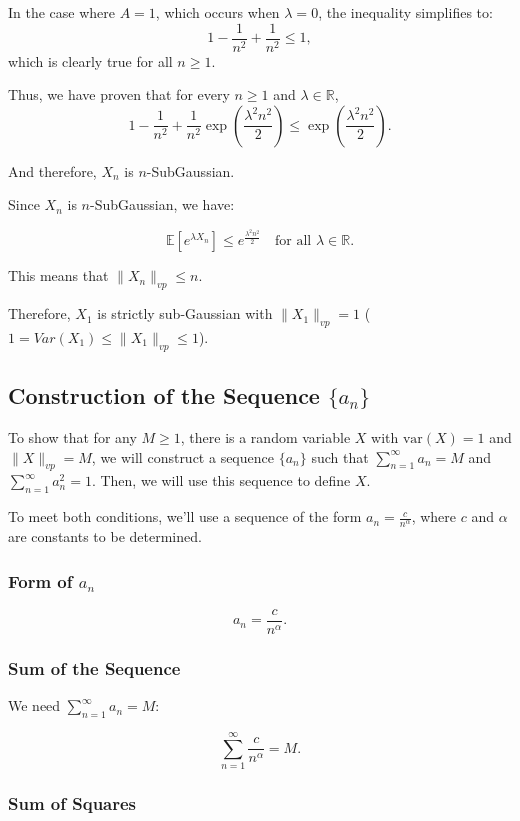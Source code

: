 \documentclass[a4 paper]{article}
\theoremstyle{boldStyle}
\theoremstyle{boldBlueStyle}
\theoremstyle{boldPurpleStyle}
\theoremstyle{boldRedStyle}
\begin{document}
\begin{enumerate}
In the case where $A = 1$, which occurs when $\lambda = 0$, the inequality simplifies to:
\[
1 - \frac{1}{n^2} + \frac{1}{n^2} \leq 1,
\]
which is clearly true for all $n \geq 1$.

Thus, we have proven that for every $n \geq 1$ and $\lambda \in \mathbb{R}$,
\[
1 - \frac{1}{n^2} + \frac{1}{n^2} \exp\left( \frac{\lambda^2 n^2}{2} \right) \leq \exp\left( \frac{\lambda^2 n^2}{2} \right).
\]

And therefore, $X_n$ is $n$-SubGaussian.

Since $X_n$ is $n$-SubGaussian, we have:

\[
\mathbb{E}[e^{\lambda X_n}] \leq e^{\frac{\lambda^2 n^2}{2}} \quad \text{for all } \lambda \in \mathbb{R}.
\]

This means that $\|X_n\|_{vp} \leq n$.

Therefore, $X_1$ is strictly sub-Gaussian with $\|X_1\|_{vp} = 1$  ( $ 1 = Var(X_1) \leq \|X_1\|_{vp} \leq 1$).

\subsection*{Construction of the Sequence \(\{a_n\}\)}


To show that for any \(M \geq 1\), there is a random variable \(X\) with \(\mathrm{var}(X) = 1\) and \(\|X\|_{vp} = M\), we will 
construct a sequence \(\{a_n\}\) such that \(\sum_{n=1}^{\infty} a_n = M\) and \(\sum_{n=1}^{\infty} a_n^2 = 1\). Then, we will use this sequence to define \(X\).

To meet both conditions, we'll use a sequence of the form \(a_n = \frac{c}{n^\alpha}\), where \(c\) and \(\alpha\) are constants to be determined.

\subsubsection*{Form of \(a_n\)}

\[
a_n = \frac{c}{n^\alpha}.
\]

\subsubsection*{Sum of the Sequence}

We need \(\sum_{n=1}^{\infty} a_n = M\):

\[
\sum_{n=1}^{\infty} \frac{c}{n^\alpha} = M.
\]

\subsubsection*{Sum of Squares}


\end{enumerate}
\end{document}

